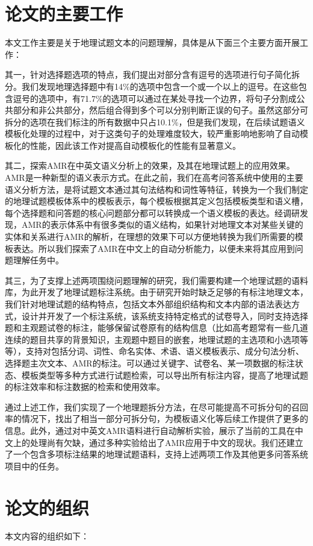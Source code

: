 \documentclass[master, winfont]{njuthesis}
\begin{document}
\section{论文的主要工作}
本文工作主要是关于地理试题文本的问题理解，具体是从下面三个主要方面开展工作：

其一，针对选择题选项的特点，我们提出对部分含有逗号的选项进行句子简化拆分。我们发现地理选择题中有14\%的选项中包含一个或一个以上的逗号。在这些包含逗号的选项中，有71.7\%的选项可以通过在某处寻找一个边界，将句子分割成公共部分和非公共部分，然后组合得到多个可以分别判断正误的句子。虽然这部分可拆分的选项在我们标注的所有数据中只占10.1\%，但是我们发现，在后续试题语义模板化处理的过程中，对于这类句子的处理难度较大，较严重影响地影响了自动模板化的性能，因此该工作对提高自动模板化的性能有显著意义。

其二，探索AMR在中英文语义分析上的效果，及其在地理试题上的应用效果。AMR是一种新型的语义表示方式。在此之前，我们在高考问答系统中使用的主要语义分析方法，是将试题文本通过其句法结构和词性等特征，转换为一个我们制定的地理试题模板体系中的模板表示，每个模板根据其定义包括模板类型和语义槽，每个选择题和问答题的核心问题部分都可以转换成一个语义模板的表达。经调研发现，AMR的表示体系中有很多类似的语义结构，如果针对地理文本对某些关键的实体和关系进行AMR的解析，在理想的效果下可以方便地转换为我们所需要的模板表达。所以我们探索了AMR在中文上的自动分析能力，以便未来将其应用到问题理解任务中。

其三，为了支撑上述两项围绕问题理解的研究，我们需要构建一个地理试题的语料库，为此开发了地理试题标注系统。由于研究开始时缺乏足够的有标注地理文本，我们针对地理试题的结构特点，包括文本外部组织结构和文本内部的语法表达方式，设计并开发了一个标注系统，该系统支持特定格式的试卷导入，同时支持选择题和主观题试卷的标注，能够保留试卷原有的结构信息（比如高考题常有一些几道连续的题目共享的背景知识，主观题中题目的嵌套，地理试题的主选项和小选项等等），支持对包括分词、词性、命名实体、术语、语义模板表示、成分句法分析、选择题主次文本、AMR的标注。可以通过关键字、试卷名、某一项数据的标注状态、模板类型等多种方式进行试题检索，可以导出所有标注内容，提高了地理试题的标注效率和标注数据的检索和使用效率。

通过上述工作，我们实现了一个地理题拆分方法，在尽可能提高不可拆分句的召回率的情况下，找出了相当一部分可拆分句，为模板语义化等后续工作提供了更多的信息。此外，通过对中英文AMR语料进行自动解析实验，展示了当前的工具在中文上的处理尚有欠缺，通过多种实验给出了AMR应用于中文的现状。我们还建立了一个包含多项标注结果的地理试题语料，支持上述两项工作及其他更多问答系统项目中的任务。

\section{论文的组织}
本文内容的组织如下：
\end{document}
